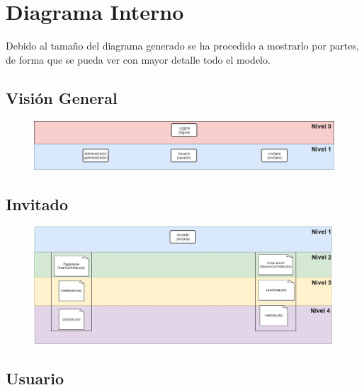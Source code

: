 \chapter{Diagrama Interno}

Debido al tama\~{n}o del diagrama generado se ha procedido a mostrarlo por partes, de forma que se pueda ver con mayor detalle todo el modelo.

\section{Visi\'{o}n General}

\begin{figure}[h!]
\centering
\includegraphics[width=1\textwidth]{Img/Disenyo/upohouse_dint_general.jpg}
\end{figure}

\section{Invitado}

\begin{figure}[h!]
\centering
\includegraphics[width=1\textwidth]{Img/Disenyo/upohouse_dint_invitado.jpg}
\end{figure}

\pagebreak

\section{Usuario}

